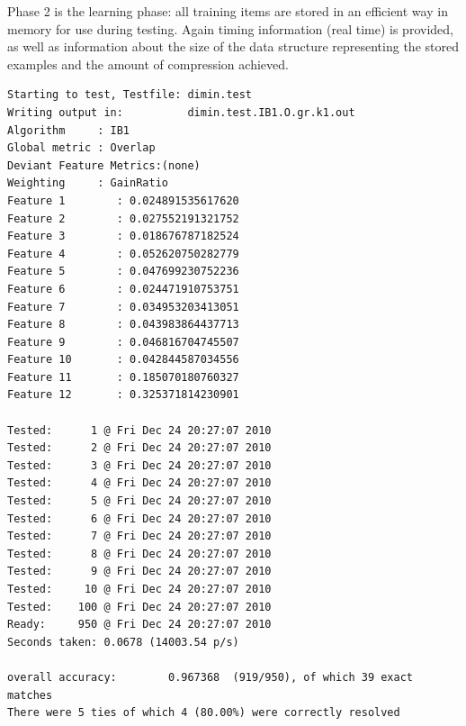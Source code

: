 \documentclass{book}
\begin{document}

Phase 2 is the learning phase: all training items are stored in an
efficient way in memory for use during testing. Again timing
information (real time) is provided, as well as information about the
size of the data structure representing the stored examples and the
amount of compression achieved.



{\footnotesize
\begin{verbatim}
Starting to test, Testfile: dimin.test
Writing output in:          dimin.test.IB1.O.gr.k1.out
Algorithm     : IB1
Global metric : Overlap
Deviant Feature Metrics:(none)
Weighting     : GainRatio
Feature 1        : 0.024891535617620
Feature 2        : 0.027552191321752
Feature 3        : 0.018676787182524
Feature 4        : 0.052620750282779
Feature 5        : 0.047699230752236
Feature 6        : 0.024471910753751
Feature 7        : 0.034953203413051
Feature 8        : 0.043983864437713
Feature 9        : 0.046816704745507
Feature 10       : 0.042844587034556
Feature 11       : 0.185070180760327
Feature 12       : 0.325371814230901

Tested:      1 @ Fri Dec 24 20:27:07 2010
Tested:      2 @ Fri Dec 24 20:27:07 2010
Tested:      3 @ Fri Dec 24 20:27:07 2010
Tested:      4 @ Fri Dec 24 20:27:07 2010
Tested:      5 @ Fri Dec 24 20:27:07 2010
Tested:      6 @ Fri Dec 24 20:27:07 2010
Tested:      7 @ Fri Dec 24 20:27:07 2010
Tested:      8 @ Fri Dec 24 20:27:07 2010
Tested:      9 @ Fri Dec 24 20:27:07 2010
Tested:     10 @ Fri Dec 24 20:27:07 2010
Tested:    100 @ Fri Dec 24 20:27:07 2010
Ready:     950 @ Fri Dec 24 20:27:07 2010
Seconds taken: 0.0678 (14003.54 p/s)

overall accuracy:        0.967368  (919/950), of which 39 exact matches
There were 5 ties of which 4 (80.00%) were correctly resolved
\end{verbatim}
}


\end{document}
